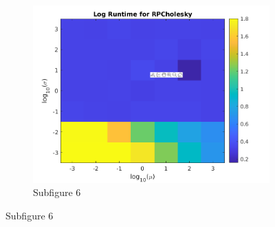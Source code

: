 \documentclass[12pt,letterpaper]{article}
\begin{document}
\begin{enumerate}
\begin{figure}[ht]
\begin{subfigure}[t]{0.3\textwidth}
        \includegraphics[width=\textwidth]{plots/rpc2.png}
        \caption{Subfigure 6}
        \label{fig:sub6}
    \end{subfigure}
    

\end{figure}
\end{enumerate}
\end{document}

